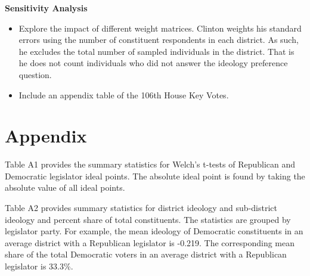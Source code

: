 \documentclass[10pt,letterpaper]{article}
\begin{document}
\textbf{Sensitivity Analysis}
\begin{itemize}
\item Explore the impact of different weight matrices. Clinton weights his standard errors using the number of constituent respondents in each district. As such, he excludes the total number of sampled individuals in the district. That is he does not count individuals who did not answer the ideology preference question. 
\item Include an appendix table of the 106th House Key Votes.
\end{itemize}



\newpage

\newpage



\newpage
\section{Appendix} 
\setcounter{table}{0}
\renewcommand{\thetable}{A\arabic{table}}
\setcounter{figure}{0}
\renewcommand{\thefigure}{A\arabic{figure}}

%
Table A1 provides the summary statistics for Welch's t-tests of Republican and Democratic legislator ideal points. The absolute ideal point is found by taking the absolute value of all ideal points.
 

Table A2 provides summary statistics for district ideology and sub-district ideology and percent share of total constituents. The statistics are grouped by legislator party. For example, the mean ideology of Democratic constituents in an average district with a Republican legislator is -0.219. The corresponding mean share of the total Democratic voters in an average district with a Republican legislator is 33.3\%.
 


 

 

% 




 




\end{document}
